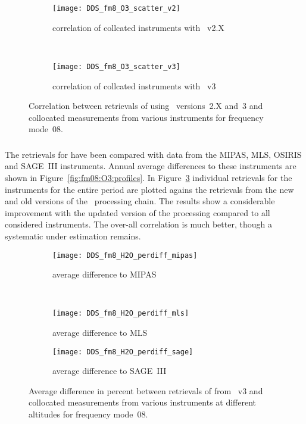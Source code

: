 \begin{figure}[htpb]
    \centering
    \begin{subfigure}[b]{0.49\textwidth}
        \texttt{[image: DDS\_fm8\_O3\_scatter\_v2]}
        \caption{correlation of collcated instruments with \smr~v2.X}
        \label{fig:fm08:O3:scatter:v2}
    \end{subfigure}
    \,
    \begin{subfigure}[b]{0.49\textwidth}
        \texttt{[image: DDS\_fm8\_O3\_scatter\_v3]}
        \caption{correlation of collcated instruments with \smr~v3}
        \label{fig:fm08:O3:scatter:v3}
    \end{subfigure}
    \caption{Correlation between retrievals of  using \smr\
    versions~2.X and~3 and collocated measurements from various instruments
    for frequency mode~08.}
    \label{fig:fm08:O3:scatter}
\end{figure}

\subsubsection{}
\label{sec:fm08:comparison:O3}
The retrievals for \chem{O_3} have been compared with data from the MIPAS, MLS,
OSIRIS and SAGE~III instruments. Annual average differences to these
instruments are shown in Figure~\ref{fig:fm08:O3:profiles}. In
Figure~\ref{fig:fm08:O3:scatter} individual retrievals for the instruments for
the entire period are plotted agains the retrievals from the new and old
versions of the \smr\ processing chain. The results show a considerable
improvement with the updated version of the processing compared to all
considered instruments. The over-all correlation is much better, though a
systematic under estimation remains.



\begin{figure}[htpb]
    \centering
    \begin{subfigure}[b]{0.49\textwidth}
        \texttt{[image: DDS\_fm8\_H2O\_perdiff\_mipas]}
        \caption{average difference to MIPAS}
        \label{fig:fm08:H2O:profiles:MIPAS}
    \end{subfigure}
    \,
    \begin{subfigure}[b]{0.49\textwidth}
        \texttt{[image: DDS\_fm8\_H2O\_perdiff\_mls]}
        \caption{average difference to MLS}
        \label{fig:fm08:H2O:profiles:MLS}
    \end{subfigure}

    \begin{subfigure}[b]{0.49\textwidth}
        \texttt{[image: DDS\_fm8\_H2O\_perdiff\_sage]}
        \caption{average difference to SAGE~III}
        \label{fig:fm08:H2O:profiles:SAGEIII}
    \end{subfigure}
    \caption{Average difference in percent between retrievals of 
    from \smr~v3 and collocated measurements from various instruments at
    different altitudes for frequency mode~08.}

    \label{fig:fm08:H2O:profiles}
\end{figure}

